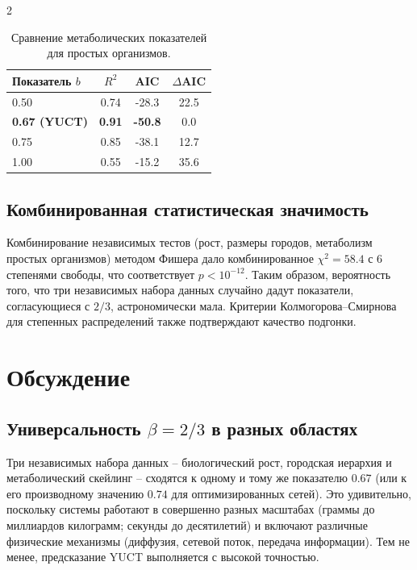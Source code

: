 \documentclass[11pt,a4paper]{article}
\begin{document}
\begin{multicols}{2}
		\begin{table}[htbp]
			\centering
			\caption{Сравнение метаболических показателей для простых организмов.}
			\label{tab:comparison_metab}
			\begin{tabular}{lccc}
				\toprule
				\textbf{Показатель \(b\)} & \(R^2\) & AIC & \(\Delta\)AIC \\
				\midrule
				0.50 & 0.74 & -28.3 & 22.5 \\
				\textbf{0.67 (YUCT)} & \textbf{0.91} & \textbf{-50.8} & 0.0 \\
				0.75 & 0.85 & -38.1 & 12.7 \\
				1.00 & 0.55 & -15.2 & 35.6 \\
				\bottomrule
			\end{tabular}
		\end{table}
		
		\subsection{Комбинированная статистическая значимость}
		
		Комбинирование независимых тестов (рост, размеры городов, метаболизм простых организмов) методом Фишера дало комбинированное \(\chi^2 = 58.4\) с 6 степенями свободы, что соответствует \(p < 10^{-12}\). Таким образом, вероятность того, что три независимых набора данных случайно дадут показатели, согласующиеся с \(2/3\), астрономически мала. Критерии Колмогорова–Смирнова для степенных распределений также подтверждают качество подгонки.
		
		\section{Обсуждение}
		
		\subsection{Универсальность \(\beta = 2/3\) в разных областях}
		
		Три независимых набора данных – биологический рост, городская иерархия и метаболический скейлинг – сходятся к одному и тому же показателю \(0.67\) (или к его производному значению \(0.74\) для оптимизированных сетей). Это удивительно, поскольку системы работают в совершенно разных масштабах (граммы до миллиардов килограмм; секунды до десятилетий) и включают различные физические механизмы (диффузия, сетевой поток, передача информации). Тем не менее, предсказание YUCT выполняется с высокой точностью.
		

\end{multicols}
\end{document}
